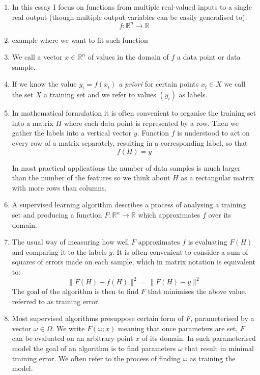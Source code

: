\documentclass[a4paper]{article}
\theoremstyle{break}
\newcommand{\R}{\mathbb{R}}
\begin{document}
\begin{enumerate}
    \item In this essay I focus on functions from multiple real-valued inputs to a single real output (though multiple output variables can be easily generalised to).
    $$ f : \R^n \to \R $$
    
    \item example where we want to fit such function
    
    \item We call a vector $x \in \R^n $ of values in the domain of $f$ a data point or data sample.
    
    \item If we know the value $ y_i = f(x_i) $ \textit{a priori} for certain points $ x_i \in X $ we call the set $X$ a training set and we refer to values $ ( y_i) $ as labels.
    
    \item In mathematical formulation it is often convenient to organise the training set into a matrix $H$ where each data point is represented by a row. Then we gather the labels into a vertical vector $y$. Function $f$ is understood to act on every row of a matrix separately, resulting in a corresponding label, so that
    $$ f(H) = y $$
    
    In most practical applications the number of data samples is much larger than the number of the features so we think about $H$ as a rectangular matrix with more rows than columns.
    
    \item A supervised learning algorithm describes a process of analysing a training set and producing a function $ F : \R^n \to \R $ which approximates $f$ over its domain.
    
    \item The usual way of measuring how well $F$ approximates $f$ is evaluating $F(H)$ and comparing it to the labels $y$.
    It is often convenient to consider a sum of squares of errors made on each sample, which in matrix notation is equivalent to:
    $$ \| F(H) - f(H) \|^2 = \| F(H) - y \|^2 $$
    The goal of the algorithm is then to find $F$ that minimises the above value, referred to as training error.
    
    \item Most supervised algorithms presuppose certain form of $F$, parameterised by a vector $ \omega \in \Omega$. We write $ F(\omega; x) $ meaning that once parameters are set, $F$ can be evaluated on an arbitrary point $x$ of its domain. In such parameterised model the goal of an algorithm is to find parameters $\omega$ that result in minimal training error. We often refer to the process of finding $ \omega $ as training the model.


\end{enumerate}
\end{document}
